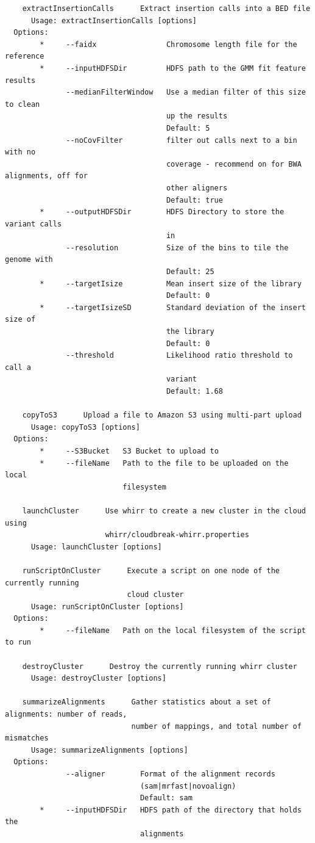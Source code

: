 \documentclass[11pt]{article}
\begin{document}
\begin{verbatim}
    extractInsertionCalls      Extract insertion calls into a BED file
      Usage: extractInsertionCalls [options]
  Options:
        *     --faidx                Chromosome length file for the reference
        *     --inputHDFSDir         HDFS path to the GMM fit feature results
              --medianFilterWindow   Use a median filter of this size to clean
                                     up the results
                                     Default: 5
              --noCovFilter          filter out calls next to a bin with no
                                     coverage - recommend on for BWA alignments, off for
                                     other aligners
                                     Default: true
        *     --outputHDFSDir        HDFS Directory to store the variant calls
                                     in
              --resolution           Size of the bins to tile the genome with
                                     Default: 25
        *     --targetIsize          Mean insert size of the library
                                     Default: 0
        *     --targetIsizeSD        Standard deviation of the insert size of
                                     the library
                                     Default: 0
              --threshold            Likelihood ratio threshold to call a
                                     variant
                                     Default: 1.68

    copyToS3      Upload a file to Amazon S3 using multi-part upload
      Usage: copyToS3 [options]
  Options:
        *     --S3Bucket   S3 Bucket to upload to
        *     --fileName   Path to the file to be uploaded on the local
                           filesystem

    launchCluster      Use whirr to create a new cluster in the cloud using 
                       whirr/cloudbreak-whirr.properties
      Usage: launchCluster [options]

    runScriptOnCluster      Execute a script on one node of the currently running 
                            cloud cluster
      Usage: runScriptOnCluster [options]
  Options:
        *     --fileName   Path on the local filesystem of the script to run

    destroyCluster      Destroy the currently running whirr cluster
      Usage: destroyCluster [options]

    summarizeAlignments      Gather statistics about a set of alignments: number of reads, 
                             number of mappings, and total number of mismatches
      Usage: summarizeAlignments [options]
  Options:
              --aligner        Format of the alignment records
                               (sam|mrfast|novoalign)
                               Default: sam
        *     --inputHDFSDir   HDFS path of the directory that holds the
                               alignments


\end{verbatim}
\end{document}
